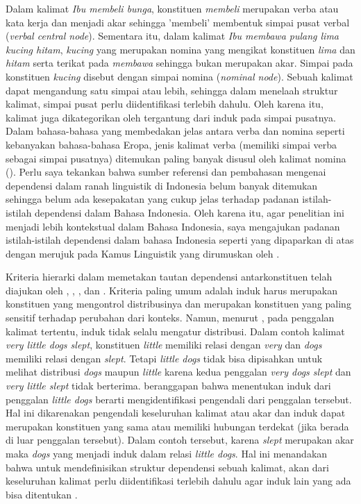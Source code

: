Dalam kalimat \textit{Ibu membeli bunga}, konstituen \textit{membeli} merupakan verba atau kata kerja dan menjadi akar sehingga 'membeli' membentuk simpai pusat verbal (\textit{verbal central node}). Sementara itu, dalam kalimat \textit{Ibu membawa pulang lima kucing hitam}, \textit{kucing} yang merupakan nomina yang mengikat konstituen \textit{lima} dan \textit{hitam} serta terikat pada \textit{membawa} sehingga bukan merupakan akar. Simpai pada konstituen \textit{kucing} disebut dengan simpai nomina (\textit{nominal node}). Sebuah kalimat dapat mengandung satu simpai atau lebih, sehingga dalam menelaah struktur kalimat, simpai pusat perlu diidentifikasi terlebih dahulu. Oleh karena itu, kalimat juga dikategorikan oleh \cite{tesniere1959elements} tergantung dari induk pada simpai pusatnya. Dalam bahasa-bahasa yang membedakan jelas antara verba dan nomina seperti kebanyakan bahasa-bahasa Eropa, jenis kalimat verba (memiliki simpai verba sebagai simpai pusatnya) ditemukan paling banyak disusul oleh kalimat nomina (\citealp{tesniere1959elements, hudson2007language}). Perlu saya tekankan bahwa sumber referensi dan pembahasan mengenai dependensi dalam ranah linguistik di Indonesia belum banyak ditemukan sehingga belum ada kesepakatan yang cukup jelas terhadap padanan istilah-istilah dependensi dalam Bahasa Indonesia. Oleh karena itu, agar penelitian ini menjadi lebih kontekstual dalam Bahasa Indonesia, saya mengajukan padanan istilah-istilah dependensi dalam bahasa Indonesia seperti yang dipaparkan di atas dengan merujuk pada Kamus Linguistik yang dirumuskan oleh \cite{kridalaksana2008kamus}.

Kriteria hierarki dalam memetakan tautan dependensi antarkonstituen telah diajukan oleh \cite{bloomfield1933language}, \cite{zwicky1985heads}, \cite{garde1977ordre}, dan \cite{mel'vcuk1988dependency}. Kriteria paling umum adalah induk harus merupakan konstituen yang mengontrol distribusinya dan merupakan konstituen yang paling sensitif terhadap perubahan dari konteks. Namun, menurut \cite{gerdes2013defining}, pada penggalan kalimat tertentu, induk tidak selalu mengatur distribusi. Dalam contoh kalimat \textit{very little dogs slept}, konstituen \textit{little} memiliki relasi dengan \textit{very} dan \textit{dogs} memiliki relasi dengan \textit{slept}. Tetapi \textit{little dogs} tidak bisa dipisahkan untuk melihat distribusi \textit{dogs} maupun \textit{little} karena kedua penggalan \textit{very dogs slept} dan \textit{very little slept} tidak berterima. \cite{gerdes2013defining} beranggapan bahwa menentukan induk dari penggalan \textit{little dogs} berarti mengidentifikasi pengendali dari penggalan tersebut. Hal ini  dikarenakan pengendali keseluruhan kalimat atau akar dan induk dapat merupakan konstituen yang sama atau memiliki hubungan terdekat (jika berada di luar penggalan tersebut). Dalam contoh tersebut, karena \textit{slept} merupakan akar maka \textit{dogs} yang menjadi induk dalam relasi \textit{little dogs}. Hal ini menandakan bahwa untuk mendefinisikan struktur dependensi sebuah kalimat, akan dari keseluruhan kalimat perlu diidentifikasi terlebih dahulu agar induk lain yang ada bisa ditentukan \citep{gerdes2013defining}. 



